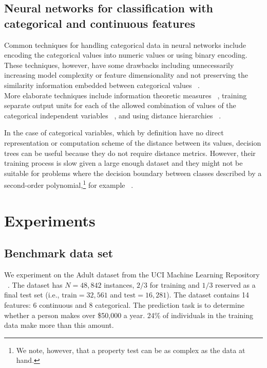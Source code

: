 \documentclass[10pt,twocolumn,letterpaper]{article}
\begin{document}
\subsection{Neural networks for classification with categorical and
continuous features}  Common techniques for handling categorical data in
neural networks include encoding the categorical values into numeric values
or using binary encoding. These techniques, however, have some drawbacks
including unnecessarily increasing model complexity or feature dimensionality
and not preserving the similarity information embedded between categorical
values ~\cite{hsu2006generalizing}.\\

More elaborate techniques include information theoretic measures
~\cite{wang2008categorical}, training separate output units for
each of the allowed combination of values of the categorical independent
variables ~\cite{brouwer2002feed}, and using distance
hierarchies ~\cite{hsu2006generalizing}.

In the case of categorical variables, which by definition have no direct
representation or computation scheme of the distance between its values,
decision trees can be useful because they do not require distance metrics.
However, their training process is slow given a large enough dataset and they
might not be suitable for problems where the decision boundary between classes
described by a second-order polynomial,\footnote{We note, however, that a
property test can be as complex as the data at hand.} for
example ~\cite{fayyad1996data}. \\

\section{Experiments} \label{section:experiments}

\subsection{Benchmark data set}

We experiment on the Adult dataset from the UCI Machine Learning Repository ~\cite{Lichman2013}. The dataset has $N=48,842$ instances, $2/3$ for training and $1/3$ reserved as a final test set (i.e., $\mathrm{train}=32,561$ and $\mathrm{test}=16,281$). The dataset contains 14 features: 6 continuous and 8 categorical. The prediction task is to determine whether a person makes over \$50,000 a year. 24\% of individuals in the training data make more than this amount. \\
\end{document}
